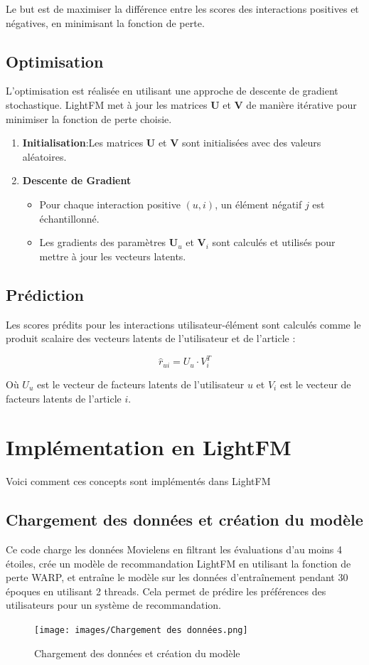 \documentclass[edit,12pt,a4paper,ChapStyle,oneside,doubleinterligne]{report}
\begin{document}
Le but est de maximiser la différence entre les scores des interactions positives et négatives, en minimisant la fonction de perte.
\subsection{Optimisation}
L'optimisation est réalisée en utilisant une approche de descente de gradient stochastique. LightFM met à jour les matrices \( \mathbf{U} \) et \( \mathbf{V} \) de manière itérative pour minimiser la fonction de perte choisie.

\begin{enumerate}
    \item \textbf{Initialisation}:Les matrices \( \mathbf{U} \) et \( \mathbf{V} \) sont initialisées avec des valeurs aléatoires.
    \item \textbf{Descente de Gradient}
    \begin{itemize}
        \item Pour chaque interaction positive \( (u, i) \), un élément négatif \( j \) est échantillonné.
        \item Les gradients des paramètres \( \mathbf{U}_u \) et \( \mathbf{V}_i \) sont calculés et utilisés pour mettre à jour les vecteurs latents.
    \end{itemize}
\end{enumerate}
\subsection{Prédiction}
Les scores prédits pour les interactions utilisateur-élément sont calculés comme le produit scalaire des vecteurs latents de l'utilisateur et de l'article :

\[
\hat{r}_{ui} = U_u \cdot V_i^T
\]

Où \(U_u\) est le vecteur de facteurs latents de l'utilisateur \(u\) et \(V_i\) est le vecteur de facteurs latents de l'article \(i\).

\section{Implémentation en LightFM}
Voici comment ces concepts sont implémentés dans LightFM
\subsection{Chargement des données et création du modèle}
Ce code charge les données Movielens en filtrant les évaluations d'au moins 4 étoiles, crée un modèle de recommandation LightFM en utilisant la fonction de perte WARP, et entraîne le modèle sur les données d'entraînement pendant 30 époques en utilisant 2 threads. Cela permet de prédire les préférences des utilisateurs pour un système de recommandation.
\begin{figure} [H]
    \centering
    \texttt{[image: images/Chargement des données.png]}
    \caption{Chargement des données et création du modèle}
    \label{fig:cdd}
\end{figure}
\end{document}

